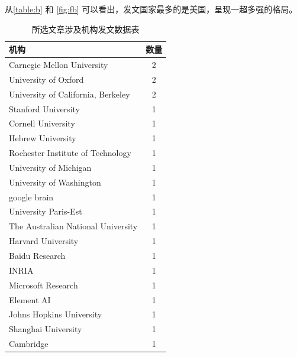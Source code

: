 从\ref{table:b} 和 \ref{fig:fb} 可以看出，发文国家最多的是美国，呈现一超多强的格局。

\begin{table}[htbp]
    \centering
    \begin{tabular}{lc}
    \hline
    \textbf{机构}                          & \multicolumn{1}{l}{\textbf{数量}} \\ \hline
    Carnegie Mellon University           & 2                               \\
    University of Oxford                 & 2                               \\
    University of California,   Berkeley & 2                               \\
    Stanford University                  & 1                               \\
    Cornell University                   & 1                               \\
    Hebrew University                    & 1                               \\
    Rochester Institute of   Technology  & 1                               \\
    University of Michigan               & 1                               \\
    University of Washington             & 1                               \\
    google brain                         & 1                               \\
    University Paris-Est                 & 1                               \\
    The   Australian National University & 1                               \\
    Harvard University                   & 1                               \\
    Baidu Research                       & 1                               \\
    INRIA                                & 1                               \\
    Microsoft Research                   & 1                               \\
    Element AI                           & 1                               \\
    Johns Hopkins University             & 1                               \\
    Shanghai University                  & 1                               \\
    Cambridge                            & 1                               \\ \hline
    \end{tabular}
    \caption{所选文章涉及机构发文数据表}
    \label{table:c}
    \end{table}

